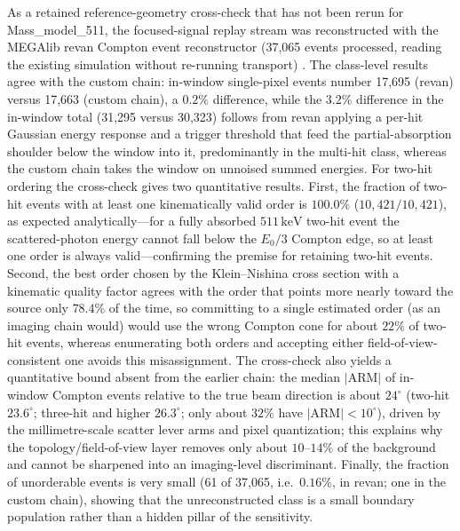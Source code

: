 \documentclass[11pt]{article}
\newcommand{\keV}{\ensuremath{\,\mathrm{keV}}}
\begin{document}
As a retained reference-geometry cross-check that has not been rerun for
Mass\_model\_511, the focused-signal replay stream was
reconstructed with the MEGAlib revan Compton event reconstructor (37,065 events
processed, reading the existing simulation without re-running transport)
\cite{Zoglauer2006}. The class-level results agree with the custom chain:
in-window single-pixel events number 17,695 (revan) versus 17,663 (custom
chain), a $0.2\%$ difference, while the $3.2\%$ difference in the in-window total
(31,295 versus 30,323) follows from revan applying a per-hit Gaussian energy
response and a trigger threshold that feed the partial-absorption shoulder below
the window into it, predominantly in the multi-hit class, whereas the custom
chain takes the window on unnoised summed energies. For two-hit ordering the
cross-check gives two quantitative results. First, the fraction of two-hit
events with at least one kinematically valid order is $100.0\%$
($10{,}421/10{,}421$), as expected analytically---for a fully absorbed
$511\keV$ two-hit event the scattered-photon energy cannot fall below the
$E_0/3$ Compton edge, so at least one order is always valid---confirming the
premise for retaining two-hit events. Second, the best order chosen by the
Klein--Nishina cross section with a kinematic quality factor agrees with the
order that points more nearly toward the source only $78.4\%$ of the time, so
committing to a single estimated order (as an imaging chain would) would use the
wrong Compton cone for about $22\%$ of two-hit events, whereas enumerating both
orders and accepting either field-of-view-consistent one avoids this
misassignment. The cross-check also yields a quantitative bound absent from the
earlier chain: the median $|\mathrm{ARM}|$ of in-window Compton events relative
to the true beam direction is about $24^\circ$ (two-hit $23.6^\circ$; three-hit
and higher $26.3^\circ$; only about $32\%$ have $|\mathrm{ARM}|<10^\circ$),
driven by the millimetre-scale scatter lever arms and pixel quantization; this
explains why the topology/field-of-view layer removes only about $10$--$14\%$ of
the background and cannot be sharpened into an imaging-level discriminant.
Finally, the fraction of unorderable events is very small (61 of 37,065, i.e.\
$0.16\%$, in revan; one in the custom chain), showing that the unreconstructed
class is a small boundary population rather than a hidden pillar of the
sensitivity.
\end{document}
